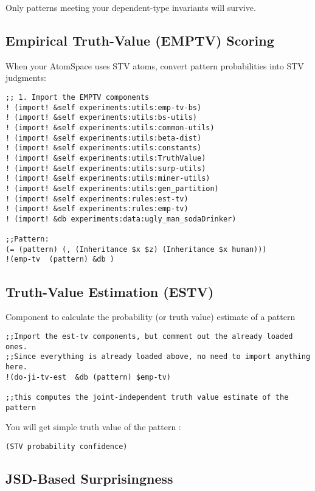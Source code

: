 \documentclass{article}
\begin{document}
Only patterns meeting your dependent-type invariants will survive.


\subsection{Empirical Truth-Value (EMPTV) Scoring}

When your AtomSpace uses STV atoms, convert pattern probabilities into STV judgments:

\begin{verbatim}
;; 1. Import the EMPTV components 
! (import! &self experiments:utils:emp-tv-bs)
! (import! &self experiments:utils:bs-utils)
! (import! &self experiments:utils:common-utils)
! (import! &self experiments:utils:beta-dist)
! (import! &self experiments:utils:constants)
! (import! &self experiments:utils:TruthValue)
! (import! &self experiments:utils:surp-utils)
! (import! &self experiments:utils:miner-utils)
! (import! &self experiments:utils:gen_partition)
! (import! &self experiments:rules:est-tv)
! (import! &self experiments:rules:emp-tv)
! (import! &db experiments:data:ugly_man_sodaDrinker)

;;Pattern: 
(= (pattern) (, (Inheritance $x $z) (Inheritance $x human)))
!(emp-tv  (pattern) &db )
\end{verbatim}

\subsection{Truth-Value Estimation (ESTV) }

Component to calculate the probability (or truth value) estimate of a pattern

\begin{verbatim}
;;Import the est-tv components, but comment out the already loaded ones.
;;Since everything is already loaded above, no need to import anything here.
!(do-ji-tv-est  &db (pattern) $emp-tv)

;;this computes the joint-independent truth value estimate of the pattern
\end{verbatim}

You will get simple truth value of the pattern :

\begin{verbatim}
(STV probability confidence)
\end{verbatim}

\subsection{JSD-Based Surprisingness}
\end{document}
